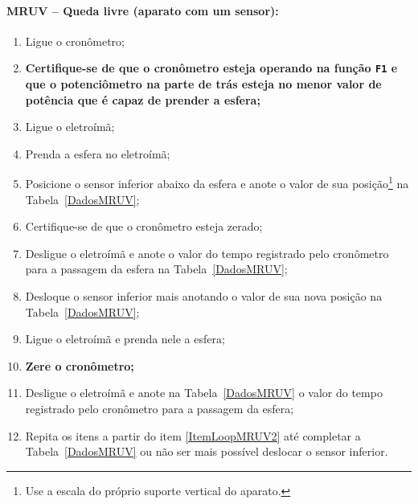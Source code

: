 \paragraph{MRUV -- Queda livre (aparato com um sensor):}

\begin{enumerate}
    \item Ligue o cronômetro;
    \item \textbf{Certifique-se de que o cronômetro esteja operando na função \texttt{F1} e que o potenciômetro na parte de trás esteja no menor valor de potência que é capaz de prender a esfera;}
    \item Ligue o eletroímã;
	\item Prenda a esfera no eletroímã;
	\item Posicione o sensor inferior  abaixo da esfera e anote o valor de sua posição\footnote{Use a escala do próprio suporte vertical do aparato.} na Tabela~\ref{DadosMRUV};
	\item Certifique-se de que o cronômetro esteja zerado;
	\item Desligue o eletroímã e anote o valor do tempo registrado pelo cronômetro para a passagem da esfera na Tabela~\ref{DadosMRUV};
	\item Desloque o sensor inferior mais  anotando o valor de sua nova posição na Tabela~\ref{DadosMRUV};\label{ItemLoopMRUV2}
	\item Ligue o eletroímã e prenda nele a esfera;
	\item \textbf{Zere o cronômetro;}
	\item Desligue o eletroímã e anote na Tabela~\ref{DadosMRUV} o valor do tempo registrado pelo cronômetro para a passagem da esfera;
	\item Repita os itens a partir do item \ref{ItemLoopMRUV2} até completar a Tabela~\ref{DadosMRUV} ou não ser mais possível deslocar o sensor inferior.
\end{enumerate}

\cleardoublepage


